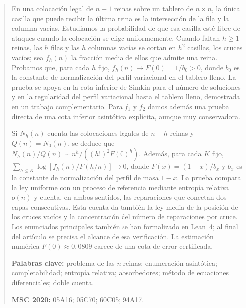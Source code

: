\begin{abstract}
\noindent En una colocación legal de $n-1$ reinas sobre un tablero de $n\times n$, la única
casilla que puede recibir la última reina es la intersección de la fila y la columna
vacías. Estudiamos la probabilidad de que esa casilla esté libre de ataques cuando
la colocación se elige uniformemente. Cuando faltan $h\ge1$ reinas, las $h$ filas
y las $h$ columnas vacías se cortan en $h^2$ casillas, los cruces vacíos; sea $f_h(n)$ la fracción
media de ellos que admite una reina. Probamos que, para cada $h$
fijo, $f_h(n)\to F(0)=1/b_0>0$, donde $b_0$ es la constante de normalización del
perfil variacional en el tablero lleno. La prueba se apoya en la cota inferior de Simkin para el
número de soluciones y en la regularidad del perfil variacional hasta el tablero lleno, demostrada
en un trabajo complementario. Para $f_1$ y $f_2$ damos además una prueba directa de una cota
inferior asintótica explícita, aunque muy conservadora.

\smallskip\noindent Si $N_h(n)$ cuenta las colocaciones legales de $n-h$ reinas y $Q(n)=N_0(n)$,
se deduce que $N_h(n)/Q(n)\sim n^h/((h!)^2F(0)^h)$. Además, para cada $K$ fijo,
$\sum_{h\le K}\log[f_h(n)/F(h/n)]\to0$, donde $F(x)=(1-x)/b_x$ y $b_x$ es la constante de normalización
del perfil de masa $1-x$. La prueba
compara la ley uniforme con un proceso de referencia mediante entropía relativa
$o(n)$ y cuenta, en ambos sentidos, las reparaciones que conectan dos capas
consecutivas. Esta cuenta da también la ley media de la posición de los cruces vacíos y la
concentración del número de reparaciones por cruce.
\ifverificacionLean
Los enunciados principales también se han formalizado en Lean~4; al final del artículo se
precisa el alcance de esa verificación.
\fi
La estimación numérica $F(0)\approx0{,}0809$ carece de una cota de error certificada.

\medskip\noindent
\textbf{Palabras clave:} problema de las $n$ reinas; enumeración asintótica; completabilidad;
entropía relativa; absorbedores; método de ecuaciones diferenciales; doble cuenta.

\noindent
\textbf{MSC 2020:} 05A16; 05C70; 60C05; 94A17.
\end{abstract}

